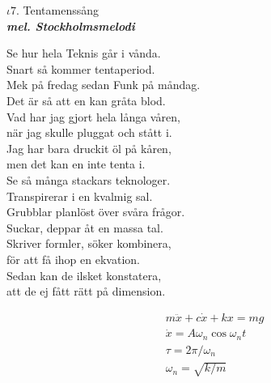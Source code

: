 \documentclass[a6paper,10pt]{article}
\newcommand{\mel}[1]{\small\textbf{\textit{mel. #1 \\}}}
\begin{document}
\setlength{\oddsidemargin}{-0.47in}
\noindent
\begin{center}
\Large $\iota7$. Tentamenssång \\ 
\mel{Stockholmsmelodi}
\end{center}
Se hur hela Teknis går i vånda. \\
Snart så kommer tentaperiod. \\
Mek på fredag sedan Funk på måndag. \\
Det är så att en kan gråta blod. 
\vspace{5pt} \\
Vad har jag gjort hela långa våren, \\
när jag skulle pluggat och stått i. \\
Jag har bara druckit öl på kåren, \\
men det kan en inte tenta i. 
\vspace{5pt} \\
Se så många stackars teknologer. \\
Transpirerar i en kvalmig sal. \\
Grubblar planlöst över svåra frågor. \\
Suckar, deppar åt en massa tal. 
\vspace{5pt} \\
Skriver formler, söker kombinera, \\
för att få ihop en ekvation. \\
Sedan kan de ilsket konstatera, \\
att de ej fått rätt på dimension. 

\begin{flushright}
\large
\begin{align*}
&m\ddot{x} + c\dot{x} + kx = mg \\
&\dot{x} = A\omega_n\cos{\omega_nt}\\
&\tau = 2\pi/\omega_n\\
&\omega_n = \sqrt{k/m}
\end{align*}
\end{flushright}
\end{document}
